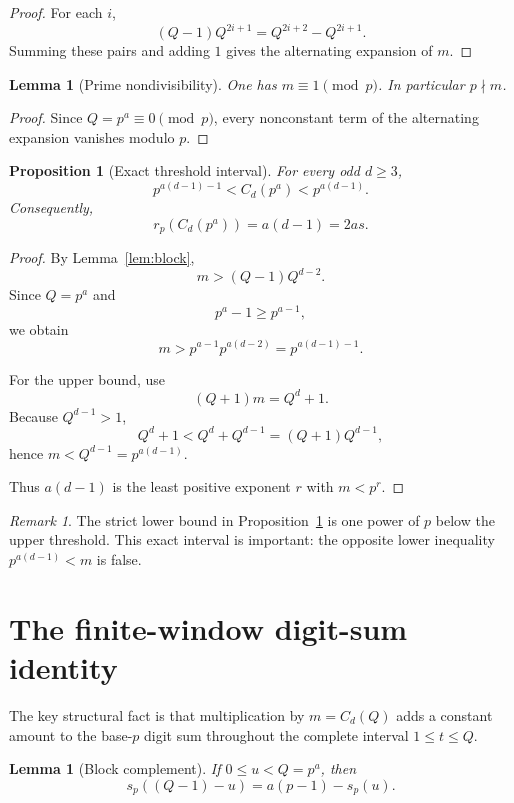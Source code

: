 \documentclass[11pt]{article}
\newtheorem{proposition}[theorem]{Proposition}
\newtheorem{lemma}[theorem]{Lemma}
\theoremstyle{definition}
\theoremstyle{remark}
\newtheorem{remark}[theorem]{Remark}
\begin{document}
\begin{proof}
For each \(i\),
\[
  (Q-1)Q^{2i+1}=Q^{2i+2}-Q^{2i+1}.
\]
Summing these pairs and adding \(1\) gives the alternating expansion of
\(m\).
\end{proof}

\begin{lemma}[Prime nondivisibility]\label{lem:coprime}
One has \(m\equiv1\pmod p\).  In particular \(p\nmid m\).
\end{lemma}

\begin{proof}
Since \(Q=p^a\equiv0\pmod p\), every nonconstant term of the alternating
expansion vanishes modulo \(p\).
\end{proof}

\begin{proposition}[Exact threshold interval]\label{prop:threshold}
For every odd \(d\ge3\),
\[
  p^{a(d-1)-1}<C_d(p^a)<p^{a(d-1)}.
\]
Consequently,
\[
  r_p(C_d(p^a))=a(d-1)=2as.
\]
\end{proposition}

\begin{proof}
By Lemma~\ref{lem:block},
\[
  m>(Q-1)Q^{d-2}.
\]
Since \(Q=p^a\) and
\[
  p^a-1\ge p^{a-1},
\]
we obtain
\[
  m>p^{a-1}p^{a(d-2)}
   =p^{a(d-1)-1}.
\]

For the upper bound, use
\[
  (Q+1)m=Q^d+1.
\]
Because \(Q^{d-1}>1\),
\[
  Q^d+1<Q^d+Q^{d-1}=(Q+1)Q^{d-1},
\]
hence \(m<Q^{d-1}=p^{a(d-1)}\).

Thus \(a(d-1)\) is the least positive exponent \(r\) with \(m<p^r\).
\end{proof}

\begin{remark}
The strict lower bound in Proposition~\ref{prop:threshold} is one power of
\(p\) below the upper threshold.  This exact interval is important: the
opposite lower inequality \(p^{a(d-1)}<m\) is false.
\end{remark}

\section{The finite-window digit-sum identity}\label{sec:digits}

The key structural fact is that multiplication by \(m=C_d(Q)\) adds a constant
amount to the base-\(p\) digit sum throughout the complete interval
\(1\le t\le Q\).

\begin{lemma}[Block complement]\label{lem:complement}
If \(0\le u<Q=p^a\), then
\[
  s_p((Q-1)-u)=a(p-1)-s_p(u).
\]
\end{lemma}
\end{document}
